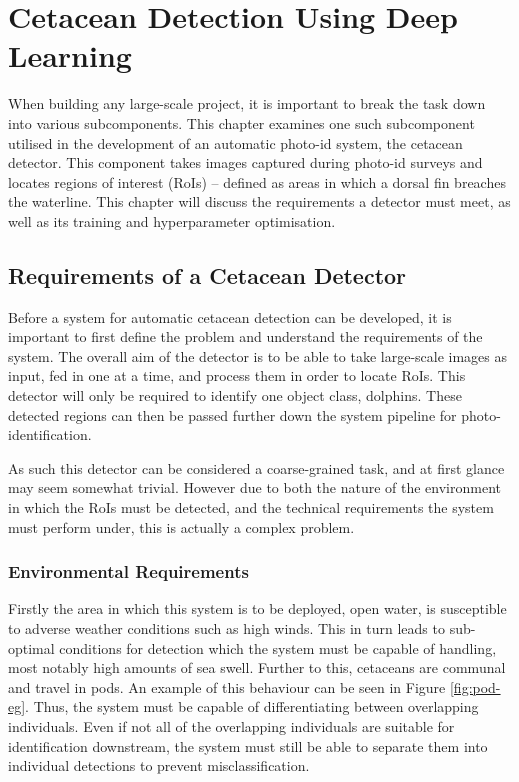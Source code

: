 \chapter{Cetacean Detection Using Deep Learning}\label{ch:cetDet}

When building any large-scale project, it is important to break the task down into various subcomponents. This chapter examines one such subcomponent utilised in the development of an automatic photo-id system, the cetacean detector. This component takes images captured during photo-id surveys and locates regions of interest (RoIs) -- defined as areas in which a dorsal fin breaches the waterline. This chapter will discuss the requirements a detector must meet, as well as its training and hyperparameter optimisation. 

\section{Requirements of a Cetacean Detector}\label{ch:cetDet,sec:requirements}

Before a system for automatic cetacean detection can be developed, it is important to first define the problem and understand the requirements of the system. The overall aim of the detector is to be able to take large-scale images as input, fed in one at a time, and process them in order to locate RoIs. This detector will only be required to identify one object class, dolphins. These detected regions can then be passed further down the system pipeline for photo-identification. 

 As such this detector can be considered a coarse-grained task, and at first glance may seem somewhat trivial. However due to both the nature of the environment in which the RoIs must be detected, and the technical requirements the system must perform under, this is actually a complex problem. 
 
 \subsection{Environmental Requirements}\label{ch:cetDet,sec:requirements,sub:environmental}
 
 Firstly the area in which this system is to be deployed, open water, is susceptible to adverse weather conditions such as high winds. This in turn leads to sub-optimal conditions for detection which the system must be capable of handling, most notably high amounts of sea swell. Further to this, cetaceans are communal and travel in pods. An example of this behaviour can be seen in Figure \ref{fig:pod-eg}. Thus, the system must be capable of differentiating between overlapping individuals. Even if not all of the overlapping individuals are suitable for identification downstream, the system must still be able to separate them into individual detections to prevent misclassification.
 
